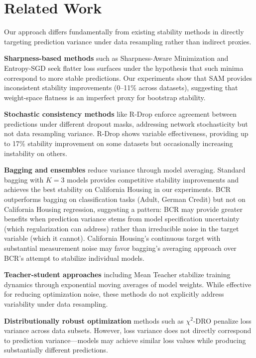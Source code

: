 \documentclass[12pt, letterpaper]{article}
\begin{document}
\section{Related Work}

Our approach differs fundamentally from existing stability methods in directly targeting prediction variance under data resampling rather than indirect proxies.

\textbf{Sharpness-based methods} such as Sharpness-Aware Minimization \citep{foret2020sharpness} and Entropy-SGD \citep{chaudhari2019entropy} seek flatter loss surfaces under the hypothesis that such minima correspond to more stable predictions. Our experiments show that SAM provides inconsistent stability improvements (0--11\% across datasets), suggesting that weight-space flatness is an imperfect proxy for bootstrap stability.

\textbf{Stochastic consistency methods} like R-Drop \citep{liang2021rdrop} enforce agreement between predictions under different dropout masks, addressing network stochasticity but not data resampling variance. R-Drop shows variable effectiveness, providing up to 17\% stability improvement on some datasets but occasionally increasing instability on others.

\textbf{Bagging and ensembles} \citep{breiman1996bagging} reduce variance through model averaging. Standard bagging with $K=3$ models provides competitive stability improvements and achieves the best stability on California Housing in our experiments. BCR outperforms bagging on classification tasks (Adult, German Credit) but not on California Housing regression, suggesting a pattern: BCR may provide greater benefits when prediction variance stems from model specification uncertainty (which regularization can address) rather than irreducible noise in the target variable (which it cannot). California Housing's continuous target with substantial measurement noise may favor bagging's averaging approach over BCR's attempt to stabilize individual models.

\textbf{Teacher-student approaches} including Mean Teacher \citep{tarvainen2017mean} stabilize training dynamics through exponential moving averages of model weights. While effective for reducing optimization noise, these methods do not explicitly address variability under data resampling.

\textbf{Distributionally robust optimization} methods such as $\chi^2$-DRO \citep{duchi2021learning} penalize loss variance across data subsets. However, loss variance does not directly correspond to prediction variance---models may achieve similar loss values while producing substantially different predictions.
\end{document}
